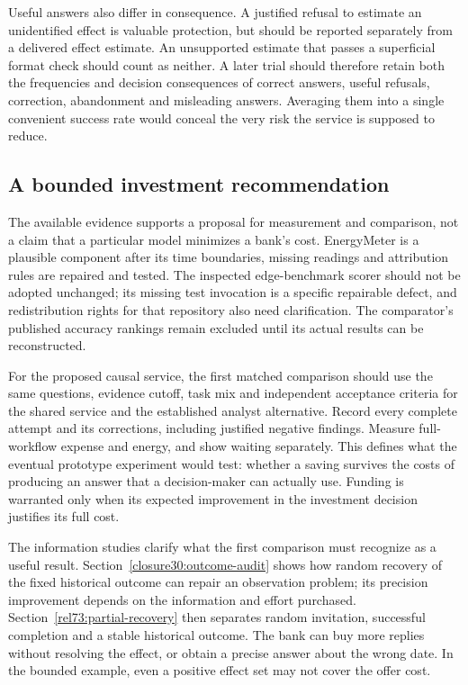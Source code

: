 Useful answers also differ in consequence. A justified refusal to estimate
an unidentified effect is valuable protection, but should be reported
separately from a delivered effect estimate. An unsupported estimate that
passes a superficial format check should count as neither. A later trial
should therefore retain both the frequencies and decision consequences of
correct answers, useful refusals, correction, abandonment and misleading
answers. Averaging them into a single convenient success rate would conceal
the very risk the service is supposed to reduce.

\subsection{A bounded investment recommendation}

The available evidence supports a proposal for measurement and comparison,
not a claim that a particular model minimizes a bank's cost. EnergyMeter is
a plausible component after its time boundaries, missing readings and
attribution rules are repaired and tested. The inspected edge-benchmark
scorer should not be adopted unchanged; its missing test invocation is a
specific repairable defect, and redistribution rights for that repository
also need clarification. The comparator's published accuracy rankings
remain excluded until its actual results can be reconstructed.

For the proposed causal service, the first matched comparison should use
the same questions, evidence cutoff, task mix and independent acceptance
criteria for the shared service and the established analyst alternative.
Record every complete attempt and its corrections, including justified
negative findings. Measure full-workflow expense and energy, and show
waiting separately. This defines what the eventual prototype experiment
would test: whether a saving survives the costs of producing an answer
that a decision-maker can actually use. Funding is warranted only when
its expected improvement in the investment decision justifies its full
cost.

The information studies clarify what the first comparison must recognize as
a useful result. Section~\ref{closure30:outcome-audit} shows how random
recovery of the fixed historical outcome can repair an observation problem;
its precision improvement
depends on the information and effort purchased. Section~\ref{rel73:partial-recovery}
then separates random invitation, successful completion and a stable historical
outcome. The bank can buy more replies without resolving the effect, or obtain
a precise answer about the wrong date. In the bounded example, even a positive
effect set may not cover the offer cost.

